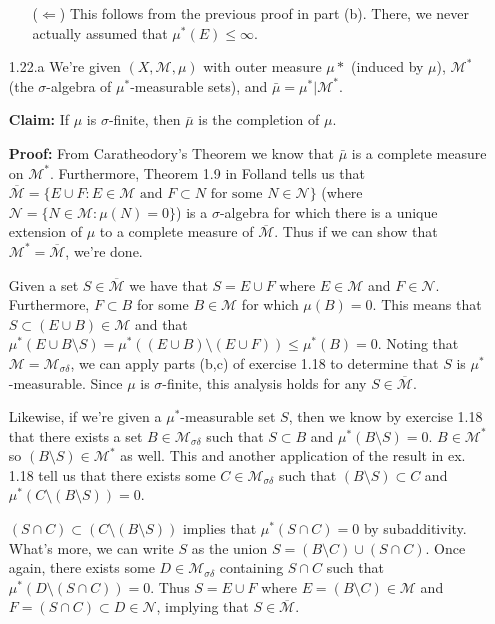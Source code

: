 \documentclass[11pt,letter]{article}
\begin{document}
\begin{enumerate}
\begin{enumerate}
        ($\Leftarrow$) This follows from the previous proof in part (b). There, we never actually assumed that $\mu^*(E) \le \infty$.

    \end{enumerate}
    \item[1.22.a] We're given $(X,\mathcal{M},\mu)$ with outer measure $\mu*$ (induced by $\mu$), $\mathcal{M}^*$ (the $\sigma$-algebra of $\mu^*$-measurable sets), and $\bar\mu = \mu^*|\mathcal{M}^*$.

    \textbf{Claim:} If $\mu$ is $\sigma$-finite, then $\bar\mu$ is the completion of $\mu$.

    \textbf{Proof:} From Caratheodory's Theorem we know that $\bar\mu$ is a complete measure on $\mathcal{M}^*$. Furthermore, Theorem 1.9 in Folland tells us that $ \overline{\mathcal{M}} = \{E \cup F: E \in \mathcal{M} \text{ and } F \subset N \text{ for some } N \in \mathcal{N} \}$ (where $\mathcal{N} = \{N \in \mathcal{M}: \mu(N) = 0\}$) is a $\sigma$-algebra for which there is a unique extension of $\mu$ to a complete measure of $\overline{\mathcal{M}}$. Thus if we can show that $\mathcal{M}^* = \overline{\mathcal{M}}$, we're done.

    Given a set $S \in \overline{\mathcal{M}}$ we have that $S = E \cup F$ where $E \in \mathcal{M}$ and $F \in \mathcal{N}$. Furthermore, $F \subset B$ for some $B \in \mathcal{M}$ for which $\mu(B) = 0$. This means that $S \subset (E \cup B) \in \mathcal{M}$ and that $\mu^*(E\cup B \setminus S) = \mu^*((E \cup B) \setminus (E \cup F)) \le \mu^*(B) = 0$. Noting that $\mathcal{M} = \mathcal{M}_{\sigma\delta}$, we can apply parts (b,c) of exercise 1.18 to determine that $S$ is $\mu^*$-measurable. Since $\mu$ is $\sigma$-finite, this analysis holds for any $S \in \overline{\mathcal{M}}$.

    Likewise, if we're given a $\mu^*$-measurable set $S$, then we know by exercise 1.18 that there exists a set $B \in \mathcal{M}_{\sigma\delta}$ such that $S \subset B$ and $\mu^*(B \setminus S) = 0$. $B \in \mathcal{M}^*$ so $(B \setminus S) \in \mathcal{M}^*$ as well. This and another application of the result in ex. 1.18 tell us that there exists some $C \in \mathcal{M}_{\sigma\delta}$ such that $(B \setminus S) \subset C$ and $\mu^*(C \setminus (B \setminus S)) = 0$.
    
    $(S \cap C) \subset (C \setminus (B \setminus S))$ implies that $\mu^*(S \cap C) = 0$ by subadditivity. What's more, we can write $S$ as the union $S = (B \setminus C) \cup (S \cap C)$. Once again, there exists some  $D \in \mathcal{M}_{\sigma\delta}$ containing $S \cap C$ such that $\mu^*(D \setminus (S \cap C)) = 0$. Thus $S = E \cup F$ where $E = (B \setminus C) \in \mathcal{M}$ and $F = (S \cap C) \subset D \in \mathcal{N}$, implying that $S \in \overline{\mathcal{M}}$.


\end{enumerate}
\end{document}
